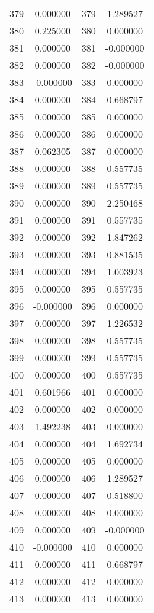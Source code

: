 \documentclass[12pt]{article}
\begin{document}
\begin{longtable}{@{}cccc@{}}
379 & 0.000000 & 379 & 1.289527 \\
380 & 0.225000 & 380 & 0.000000 \\
381 & 0.000000 & 381 & -0.000000 \\
382 & 0.000000 & 382 & -0.000000 \\
383 & -0.000000 & 383 & 0.000000 \\
384 & 0.000000 & 384 & 0.668797 \\
385 & 0.000000 & 385 & 0.000000 \\
386 & 0.000000 & 386 & 0.000000 \\
387 & 0.062305 & 387 & 0.000000 \\
388 & 0.000000 & 388 & 0.557735 \\
389 & 0.000000 & 389 & 0.557735 \\
390 & 0.000000 & 390 & 2.250468 \\
391 & 0.000000 & 391 & 0.557735 \\
392 & 0.000000 & 392 & 1.847262 \\
393 & 0.000000 & 393 & 0.881535 \\
394 & 0.000000 & 394 & 1.003923 \\
395 & 0.000000 & 395 & 0.557735 \\
396 & -0.000000 & 396 & 0.000000 \\
397 & 0.000000 & 397 & 1.226532 \\
398 & 0.000000 & 398 & 0.557735 \\
399 & 0.000000 & 399 & 0.557735 \\
400 & 0.000000 & 400 & 0.557735 \\
401 & 0.601966 & 401 & 0.000000 \\
402 & 0.000000 & 402 & 0.000000 \\
403 & 1.492238 & 403 & 0.000000 \\
404 & 0.000000 & 404 & 1.692734 \\
405 & 0.000000 & 405 & 0.000000 \\
406 & 0.000000 & 406 & 1.289527 \\
407 & 0.000000 & 407 & 0.518800 \\
408 & 0.000000 & 408 & 0.000000 \\
409 & 0.000000 & 409 & -0.000000 \\
410 & -0.000000 & 410 & 0.000000 \\
411 & 0.000000 & 411 & 0.668797 \\
412 & 0.000000 & 412 & 0.000000 \\
413 & 0.000000 & 413 & 0.000000 \\

\end{longtable}
\end{document}
